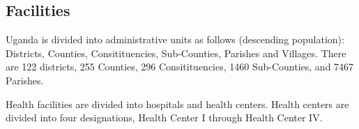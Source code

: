 \documentclass[12pt]{article} %
\begin{document}

\subsection{Facilities} %

Uganda is divided into administrative units as follows (descending population): Districts, Counties, Consitituencies, Sub-Counties, Parishes and Villages. 
There are 122 districts, 255 Counties, 296 Consitituencies, 1460 Sub-Counties, and 7467 Parishes. 

Health facilities are divided into hospitals and health centers. Health centers are divided into four designations, Health Center I through Health Center IV. \cite{UBS2017}
\end{document}
